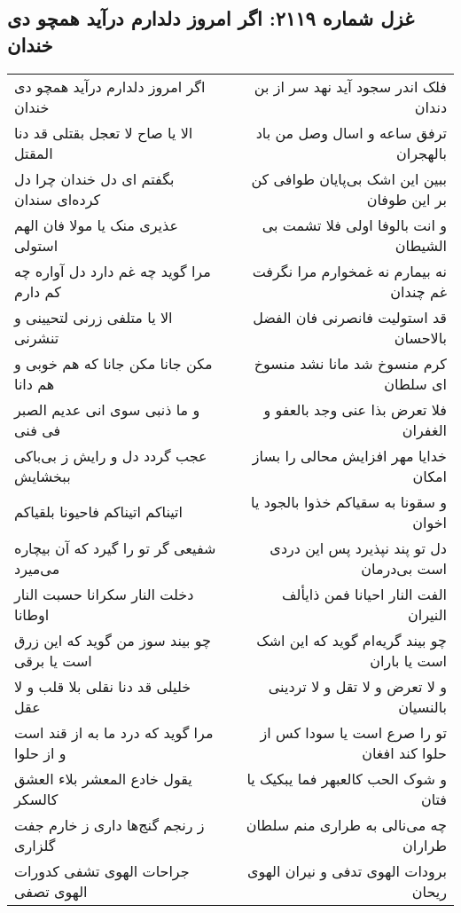 \begin{center}
\section*{غزل شماره ۲۱۱۹: اگر امروز دلدارم درآید همچو دی خندان}
\label{sec:2119}
\begin{longtable}{l p{0.5cm} r}
اگر امروز دلدارم درآید همچو دی خندان
&&
فلک اندر سجود آید نهد سر از بن دندان
\\
الا یا صاح لا تعجل بقتلی قد دنا المقتل
&&
ترفق ساعه و اسال وصل من باد بالهجران
\\
بگفتم ای دل خندان چرا دل کرده‌ای سندان
&&
ببین این اشک بی‌پایان طوافی کن بر این طوفان
\\
عذیری منک یا مولا فان الهم استولی
&&
و انت بالوفا اولی فلا تشمت بی الشیطان
\\
مرا گوید چه غم دارد دل آواره چه کم دارم
&&
نه بیمارم نه غمخوارم مرا نگرفت غم چندان
\\
الا یا متلفی زرنی لتحیینی و تنشرنی
&&
قد استولیت فانصرنی فان الفضل بالاحسان
\\
مکن جانا مکن جانا که هم خوبی و هم دانا
&&
کرم منسوخ شد مانا نشد منسوخ ای سلطان
\\
و ما ذنبی سوی انی عدیم الصبر فی فنی
&&
فلا تعرض بذا عنی وجد بالعفو و الغفران
\\
عجب گردد دل و رایش ز بی‌باکی ببخشایش
&&
خدایا مهر افزایش محالی را بساز امکان
\\
اتیناکم اتیناکم فاحیونا بلقیاکم
&&
و سقونا به سقیاکم خذوا بالجود یا اخوان
\\
شفیعی گر تو را گیرد که آن بیچاره می‌میرد
&&
دل تو پند نپذیرد پس این دردی است بی‌درمان
\\
دخلت النار سکرانا حسبت النار اوطانا
&&
الفت النار احیانا فمن ذایألف النیران
\\
چو بیند سوز من گوید که این زرق است یا برقی
&&
چو بیند گریه‌ام گوید که این اشک است یا باران
\\
خلیلی قد دنا نقلی بلا قلب و لا عقل
&&
و لا تعرض و لا تقل و لا تردینی بالنسیان
\\
مرا گوید که درد ما به از قند است و از حلوا
&&
تو را صرع است یا سودا کس از حلوا کند افغان
\\
یقول خادع المعشر بلاء العشق کالسکر
&&
و شوک الحب کالعبهر فما یبکیک یا فتان
\\
ز رنجم گنج‌ها داری ز خارم جفت گلزاری
&&
چه می‌نالی به طراری منم سلطان طراران
\\
جراحات الهوی تشفی کدورات الهوی تصفی
&&
برودات الهوی تدفی و نیران الهوی ریحان
\\

\end{longtable}
\end{center}
